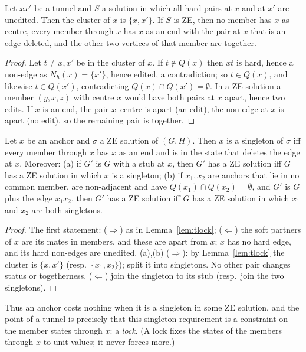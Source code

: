 \begin{lemma}\label{lem:tlock}
Let $xx'$ be a tunnel and $S$ a solution in which all hard pairs at $x$ and at $x'$ are unedited. Then the cluster of $x$ is $\{x,x'\}$. If $S$ is ZE, then no member has $x$ as centre, every member through $x$ has $x$ as an end with the pair at $x$ that is an edge deleted, and the other two vertices of that member are together.
\end{lemma}
\begin{proof}
Let $t\ne x,x'$ be in the cluster of $x$. If $t\notin Q(x)$ then $xt$ is hard, hence a non-edge as $N_h(x)=\{x'\}$, hence edited, a contradiction; so $t\in Q(x)$, and likewise $t\in Q(x')$, contradicting $Q(x)\cap Q(x')=\emptyset$. In a ZE solution a member $(y,x,z)$ with centre $x$ would have both pairs at $x$ apart, hence two edits. If $x$ is an end, the pair $x$--centre is apart (an edit), the non-edge at $x$ is apart (no edit), so the remaining pair is together.
\end{proof}

\begin{lemma}[Anchors: singleton $=$ forced states; inactive anchors cost nothing]\label{lem:tinactive}
Let $x$ be an anchor and $\sigma$ a ZE solution of $(G,H)$. Then $x$ is a singleton of $\sigma$ iff every member through $x$ has $x$ as an end and is in the state that deletes the edge at $x$. Moreover:
(a) if $G'$ is $G$ with a stub at $x$, then $G'$ has a ZE solution iff $G$ has a ZE solution in which $x$ is a singleton;
(b) if $x_1,x_2$ are anchors that lie in no common member, are non-adjacent and have $Q(x_1)\cap Q(x_2)=\emptyset$, and $G'$ is $G$ plus the edge $x_1x_2$, then $G'$ has a ZE solution iff $G$ has a ZE solution in which $x_1$ and $x_2$ are both singletons.
\end{lemma}
\begin{proof}
The first statement: ($\Rightarrow$) as in Lemma~\ref{lem:tlock}; ($\Leftarrow$) the soft partners of $x$ are its mates in members, and these are apart from $x$; $x$ has no hard edge, and its hard non-edges are unedited. (a),(b) ($\Rightarrow$): by Lemma~\ref{lem:tlock} the cluster is $\{x,x'\}$ (resp.\ $\{x_1,x_2\}$); split it into singletons. No other pair changes status or togetherness. ($\Leftarrow$) join the singleton to its stub (resp.\ join the two singletons).
\end{proof}
Thus an anchor costs nothing when it is a singleton in some ZE solution, and the point of a tunnel is precisely that this singleton requirement is a constraint on the member states through $x$: a \emph{lock}. (A lock fixes the states of the members through $x$ to unit values; it never forces more.)

